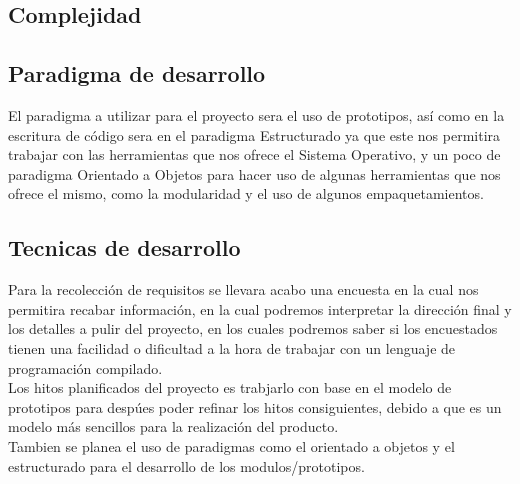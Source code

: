 \documentclass[10pt,executivepaper]{article}
\begin{document}
\subsection{Complejidad}

\subsection{Paradigma de desarrollo}
El paradigma a utilizar para el proyecto sera el uso de prototipos, así como en la escritura de código sera en el paradigma Estructurado ya que este nos permitira trabajar con las herramientas que nos ofrece el Sistema Operativo, y un poco de paradigma Orientado a Objetos para hacer uso de algunas herramientas que nos ofrece el mismo, como la modularidad y el uso de algunos empaquetamientos.
\subsection{Tecnicas de desarrollo}
Para la recolección de requisitos se llevara acabo una encuesta en la cual nos permitira recabar información, en la cual podremos interpretar la dirección final y los detalles a pulir del proyecto, en los cuales podremos saber si los encuestados tienen una facilidad o dificultad a la hora de trabajar con un lenguaje de programación compilado.\\
Los hitos planificados del proyecto es trabjarlo con base en el modelo de prototipos para despúes poder refinar los hitos consiguientes, debido a que es un modelo más sencillos para la realización del producto.\\
Tambien se planea el uso de paradigmas como el orientado a objetos y el estructurado para el desarrollo de los modulos/prototipos.
\printindex
\end{document}
